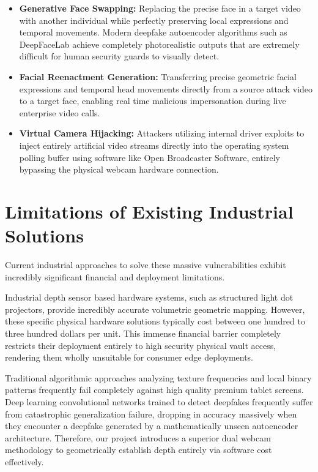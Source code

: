 \documentclass[12pt,a4paper]{report}
\begin{document}
\begin{itemize}
    \item \textbf{Generative Face Swapping:} Replacing the precise face in a target video with another individual while perfectly preserving local expressions and temporal movements. Modern deepfake autoencoder algorithms such as DeepFaceLab achieve completely photorealistic outputs that are extremely difficult for human security guards to visually detect.
    \item \textbf{Facial Reenactment Generation:} Transferring precise geometric facial expressions and temporal head movements directly from a source attack video to a target face, enabling real time malicious impersonation during live enterprise video calls.
    \item \textbf{Virtual Camera Hijacking:} Attackers utilizing internal driver exploits to inject entirely artificial video streams directly into the operating system polling buffer using software like Open Broadcaster Software, entirely bypassing the physical webcam hardware connection.
\end{itemize}

\section{Limitations of Existing Industrial Solutions}
Current industrial approaches to solve these massive vulnerabilities exhibit incredibly significant financial and deployment limitations.

Industrial depth sensor based hardware systems, such as structured light dot projectors, provide incredibly accurate volumetric geometric mapping. However, these specific physical hardware solutions typically cost between one hundred to three hundred dollars per unit. This immense financial barrier completely restricts their deployment entirely to high security physical vault access, rendering them wholly unsuitable for consumer edge deployments. 

Traditional algorithmic approaches analyzing texture frequencies and local binary patterns frequently fail completely against high quality premium tablet screens. Deep learning convolutional networks trained to detect deepfakes frequently suffer from catastrophic generalization failure, dropping in accuracy massively when they encounter a deepfake generated by a mathematically unseen autoencoder architecture. Therefore, our project introduces a superior dual webcam methodology to geometrically establish depth entirely via software cost effectively.
\end{document}
